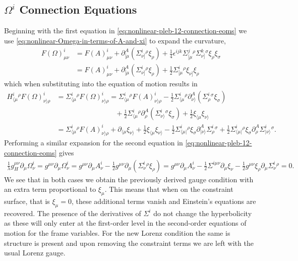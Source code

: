 \documentclass[10pt]{report}
\theoremstyle{definition}
\begin{document}
        \subsection{$\Omega^i$ Connection Equations}
        Beginning with the first equation in \cref{eq:nonlinear-pleb-12-connection-eoms} we use \cref{eq:nonlinear-Omega-in-terms-of-A-and-xi} to expand the curvature,
        \begin{align}
            F(\Omega)^i_{\mu\nu} & = F(A)^i_{\mu\nu} + \partial^A_{[\mu}\left( \Sigma^i_{\nu]}{}^\rho \xi_\rho \right) + \frac{1}{4}\epsilon^{ijk} \Sigma^j_{[\mu}{}^\rho \Sigma^k_{\nu]}{}^\sigma \xi_\rho \xi_\sigma \\
            & = F(A)^i_{\mu\nu} + \partial^A_{[\mu}\left( \Sigma^i_{\nu]}{}^\rho \xi_\rho \right) + \frac{1}{2} \Sigma^i_{[\mu}{}^\rho \xi_{\nu]} \xi_\rho
        \end{align}
        which when substituting into the equation of motion results in 
        \begin{align}
            H^i_{\langle \mu}{}^\rho F(\Omega)^i_{\nu\rangle\rho} & = \Sigma^i_{\langle \mu}{}^\rho F(\Omega)^i_{\nu\rangle\rho} = \Sigma^i_{\langle \mu}{}^\rho F(A)^i_{\nu\rangle\rho} -\frac{1}{2}\Sigma^i_{\langle \mu}{}^\rho \partial^A_{\nu\rangle} \left( \Sigma^i_\rho{}^\sigma \xi_\sigma \right) \nonumber \\ & \hspace{100pt} + \frac{1}{2} \Sigma^i_{\langle \mu}{}^\rho \partial^A_\rho \left( \Sigma^i_{\nu \rangle}{}^\sigma \xi_\sigma \right) + \frac{1}{2} \xi_{\langle \mu} \xi_{\nu \rangle} \nonumber\\ 
            & = \Sigma^i_{\langle \mu}{}^\rho F(A)^i_{\nu\rangle\rho} + \partial_{\langle \mu} \xi_{\nu \rangle} + \frac{1}{2} \xi_{\langle\mu} \xi_{\nu\rangle} - \frac{1}{2}\Sigma^i_{\langle \mu|}{}^\rho \xi_\sigma \partial^A_{|\nu\rangle} \Sigma^i_{\rho}{}^{\sigma} + \frac{1}{2} \Sigma^i_{\langle \mu|}{}^\rho \xi_\sigma \partial^A_\rho \Sigma^i_{|\nu \rangle}{}^{\sigma}.
        \end{align}
        Performing a similar expansion for the second equation in \cref{eq:nonlinear-pleb-12-connection-eoms} gives
        \begin{align}
            \frac{1}{\lambda} g_H^{\mu\nu} \partial_\mu \Omega^i_\nu = g^{\mu\nu} \partial_\mu \Omega^i_\nu = g^{\mu\nu} \partial_\mu A^i_\nu - \frac{1}{2} g^{\mu\nu} \partial_\mu \left( \Sigma^i_\nu{}^\rho \xi_\rho \right) =  g^{\mu\nu} \partial_\mu A^i_\nu - \frac{1}{2} \Sigma^{i\mu\nu} \partial_\mu \xi_\nu - \frac{1}{2} g^{\mu\nu} \xi_\rho \partial_\mu \Sigma^i_\nu{}^\rho = 0.
        \end{align}
        We see that in both cases we obtain the previously derived gauge condition with an extra term proportional to $\xi_\mu$. This means that when on the constraint surface, that is $\xi_\mu = 0$, these additional terms vanish and Einstein's equations are recovered. The presence of the derivatives of $\Sigma^i$ do not change the hyperbolicity as these will only enter at the first-order level in the second-order equations of motion for the frame variables. For the new Lorenz condition the same is structure is present and upon removing the constraint terms we are left with the usual Lorenz gauge.
        
\end{document}
